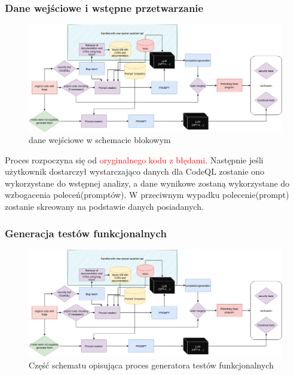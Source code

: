 \subsubsection{Dane wejściowe i wstępne przetwarzanie}
\begin{figure}[h]
    \centering
    \includegraphics[clip, trim=0cm 4cm 29cm 6cm, width=0.9\linewidth]{img/gptester.drawio.png}
    \caption{dane wejściowe w schemacie blokowym}
    \label{fig:przyciety_obrazek}
\end{figure}
Proces rozpoczyna się od \textcolor{red}{oryginalnego kodu z błędami}. Następnie jeśli użytkownik dostarczył wystarczająco danych dla CodeQL zostanie ono wykorzystane do wstępnej analizy, a dane wynikowe zostaną wykorzystane do wzbogacenia poleceń(promptów). 
W przeciwnym wypadku polecenie(prompt) zostanie skreowany na podstawie danych posiadanych. 

\subsubsection{Generacja testów funkcjonalnych}
\begin{figure}[h]
    \centering
    \includegraphics[clip, trim=0cm 0cm 0cm 13cm, width=0.9\linewidth]{img/gptester.drawio.png}
    \caption{Część schematu opisująca proces generatora testów funkcjonalnych}
    \label{fig:przyciety_obrazz}
\end{figure}

